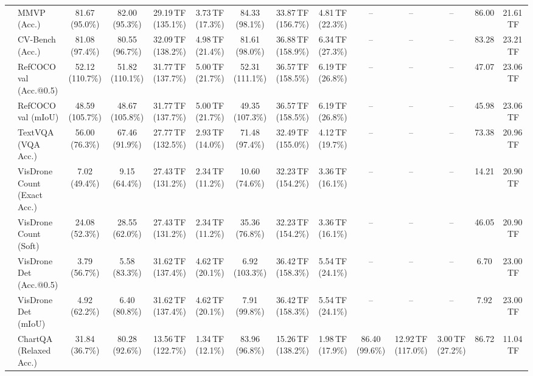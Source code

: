 \begin{table}[t]
\begin{center}
\begin{small}
\begin{sc}
{\begin{tabular}{llcccccccccccc}
& MMVP (Acc.) & 81.67 (95.0\%) & 82.00 (95.3\%) & 29.19\,TF (135.1\%) & 3.73\,TF (17.3\%) & 84.33 (98.1\%) & 33.87\,TF (156.7\%) & 4.81\,TF (22.3\%) & -- & -- & -- & 86.00 & 21.61\,TF \\
& CV-Bench (Acc.) & 81.08 (97.4\%) & 80.55 (96.7\%) & 32.09\,TF (138.2\%) & 4.98\,TF (21.4\%) & 81.61 (98.0\%) & 36.88\,TF (158.9\%) & 6.34\,TF (27.3\%) & -- & -- & -- & 83.28 & 23.21\,TF \\
& RefCOCO val (Acc.@0.5) & 52.12 (110.7\%) & 51.82 (110.1\%) & 31.77\,TF (137.7\%) & 5.00\,TF (21.7\%) & 52.31 (111.1\%) & 36.57\,TF (158.5\%) & 6.19\,TF (26.8\%) & -- & -- & -- & 47.07 & 23.06\,TF \\
& RefCOCO val (mIoU) & 48.59 (105.7\%) & 48.67 (105.8\%) & 31.77\,TF (137.7\%) & 5.00\,TF (21.7\%) & 49.35 (107.3\%) & 36.57\,TF (158.5\%) & 6.19\,TF (26.8\%) & -- & -- & -- & 45.98 & 23.06\,TF \\
& TextVQA (VQA Acc.) & 56.00 (76.3\%) & 67.46 (91.9\%) & 27.77\,TF (132.5\%) & 2.93\,TF (14.0\%) & 71.48 (97.4\%) & 32.49\,TF (155.0\%) & 4.12\,TF (19.7\%) & -- & -- & -- & 73.38 & 20.96\,TF \\
& VisDrone Count (Exact Acc.) & 7.02 (49.4\%) & 9.15 (64.4\%) & 27.43\,TF (131.2\%) & 2.34\,TF (11.2\%) & 10.60 (74.6\%) & 32.23\,TF (154.2\%) & 3.36\,TF (16.1\%) & -- & -- & -- & 14.21 & 20.90\,TF \\
& VisDrone Count (Soft) & 24.08 (52.3\%) & 28.55 (62.0\%) & 27.43\,TF (131.2\%) & 2.34\,TF (11.2\%) & 35.36 (76.8\%) & 32.23\,TF (154.2\%) & 3.36\,TF (16.1\%) & -- & -- & -- & 46.05 & 20.90\,TF \\
& VisDrone Det (Acc.@0.5) & 3.79 (56.7\%) & 5.58 (83.3\%) & 31.62\,TF (137.4\%) & 4.62\,TF (20.1\%) & 6.92 (103.3\%) & 36.42\,TF (158.3\%) & 5.54\,TF (24.1\%) & -- & -- & -- & 6.70 & 23.00\,TF \\
& VisDrone Det (mIoU) & 4.92 (62.2\%) & 6.40 (80.8\%) & 31.62\,TF (137.4\%) & 4.62\,TF (20.1\%) & 7.91 (99.8\%) & 36.42\,TF (158.3\%) & 5.54\,TF (24.1\%) & -- & -- & -- & 7.92 & 23.00\,TF \\
\midrule\midrule
{}
& ChartQA (Relaxed Acc.) & 31.84 (36.7\%) & 80.28 (92.6\%) & 13.56\,TF (122.7\%) & 1.34\,TF (12.1\%) & 83.96 (96.8\%) & 15.26\,TF (138.2\%) & 1.98\,TF (17.9\%) & 86.40 (99.6\%) & 12.92\,TF (117.0\%) & 3.00\,TF (27.2\%) & 86.72 & 11.04\,TF \\

\end{tabular}}
\end{sc}
\end{small}
\end{center}
\end{table}
